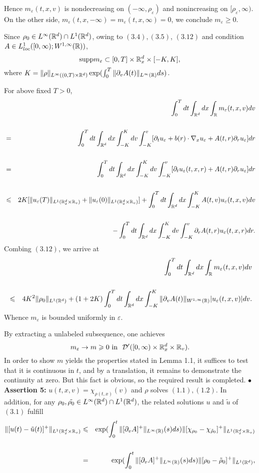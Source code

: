 \documentclass[11pt]{article}
\def\geq{\geqslant}\def\leq{\leqslant}
\begin{document}
Hence $m_\varepsilon(t,x,v)$ is nondecreasing on
$(-\infty,\rho_\varepsilon)$ and nonincreasing on
$[\rho_\varepsilon,\infty)$. On the other side,
$m_\varepsilon(t,x,-\infty)=m_\varepsilon(t,x,\infty)=0$, we
conclude $m_\varepsilon\geq 0$.
 \vskip1mm\par
Since $\rho_0\in L^\infty({\mathbb R}^d)\cap L^1({\mathbb R}^d)$, owing to $(3.4),
(3.5)$, $(3.12)$ and condition $A\in
L^1_{loc}([0,\infty);W^{1,\infty}({\mathbb R}))$,
$$
\mbox{supp}m_\varepsilon\subset [0,T]\times {\mathbb R}^d_x\times [-K,K],
$$
where $K=\|\rho\|_{L^\infty((0,T)\times
{\mathbb R}^d)}\exp(\int^T_0\|\partial_vA(t)\|_{L^\infty({\mathbb R})}ds)$.
 \vskip1mm\par
For above fixed $T>0$,
\begin{eqnarray*}
&& \int^T_0dt\int_{\mR^d}dx\int_{
\mR}m_\varepsilon(t,x,v)dv\cr\cr&=&\int^T_0dt\int_{\mR^d}dx
\int_{-K}^Kdv\int_{-K}^v[\partial_tu_\varepsilon+b(r)\cdot\nabla_x
u_\varepsilon+A(t,r)
\partial_r u_\varepsilon]dr \cr \cr &=&
\int^T_0dt\int_{\mR^d}dx\int_{-K}^Kdv\int_{-K}^v[
\partial_tu_\varepsilon(t,x,r)+A(t,r)
\partial_r u_\varepsilon]dr \cr \cr &\leq&
2K[\|u_\varepsilon(T)\|_{L^1(
\mR^d_x\times\mR_v)}+\|u_\varepsilon(0)\|_{L^1(\mR^d_x\times\mR_v)}]+
\int^T_0dt\int_{\mR^d}dx \int_{-K}^KA(t,v)u_\varepsilon(t,x,v) dv
\cr \cr && -
\int^T_0dt\int_{\mR^d}dx\int_{-K}^Kdv\int_{-K}^v\partial_r A(t,r)
u_\varepsilon(t,x,r) dr.
\end{eqnarray*}
 \vskip1mm\noindent
Combing $(3.12)$, we arrive at
\begin{eqnarray*}
&&\int^T_0dt\int_{\mR^d}dx\int_{
\mR}m_\varepsilon(t,x,v)dv\cr\cr&\leq & 4K^2
\|\rho_0\|_{L^1(\mR^d)}+(1+2K)\int^T_0dt\int_{\mR^d}dx
\int_{-K}^K\|\partial_vA(t)\|_{W^{1,\infty}(\mR)}
|u_\varepsilon(t,x,v)| dv.
\end{eqnarray*}
Whence $m_\varepsilon$ is bounded uniformly in $\varepsilon$.
  \vskip1mm\par
By extracting a unlabeled subsequence, one achieves
$$
m_\varepsilon\rightarrow m \geq 0 \ \mbox{in} \ \ {\mathcal
D}^\prime ([0,\infty)\times \mR^d_x\times\mR_v).
$$
In order to show $m$ yields the properties stated in Lemma 1.1, it
suffices to test that it is continuous in $t$, and by a translation,
it remains to demonstrate the continuity at zero. But this fact is
obvious, so the required result is completed.
   \vskip2mm\noindent
$\bullet$ \textbf{Assertion 5:} $u(t,x,v)=\chi_{\rho(t,x)}(v)$ and
$\rho$ solves $(1.1), (1.2)$. In addition, for any
$\rho_0,\tilde{\rho_0}\in L^\infty({\mathbb R}^d)\cap L^1({\mathbb R}^d)$, the
related solutions $u$ and $\tilde{u}$ of $(3.1)$ fulfill
\begin{eqnarray}\label{3.20}
\|[u(t)-\tilde{u}(t)]^+\|_{L^1(\mR^d_x\times \mR_v)}&\leq&
\exp(\int^t_0\|[\partial_vA]^+\|_{L^\infty(\mR)}(s)ds)\|[\chi_{\rho_0}-\chi_{\tilde{\rho}_0}]^+\|_{L^1(\mR^d_x\times
\mR_v)}\cr\cr&=&\exp(\int^t_0\|[\partial_vA]^+\|_{L^\infty(\mR)}(s)ds)
\|[\rho_0-\tilde{\rho}_0]^+\|_{L^1(\mR^d)},
\end{eqnarray}
\end{document}
